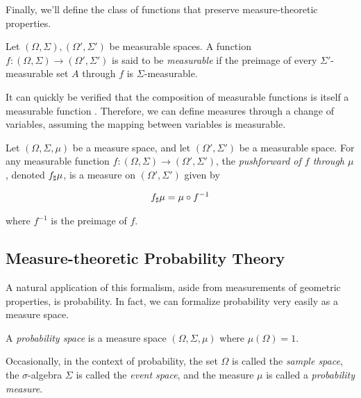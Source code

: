 Finally, we'll define the class of functions that preserve
measure-theoretic properties.

\begin{definition}[Measurability]
  Let $(\Omega, \Sigma), (\Omega', \Sigma')$ be measurable spaces. A
  function $f:(\Omega, \Sigma)\to(\Omega', \Sigma')$ is said to be
  \emph{measurable} if the preimage of every $\Sigma'$-measurable set
  $A$ through $f$ is $\Sigma$-measurable.
\end{definition}

It can quickly be verified that the composition of measurable
functions is itself a measurable function
\citep{cohn2013measure}. Therefore, we can define measures through a
change of variables, assuming the mapping between variables is
measurable.

\begin{definition}
  Let $(\Omega, \Sigma, \mu)$ be a measure space, and let $(\Omega',
  \Sigma')$ be a measurable space. For any measurable function
  $f:(\Omega, \Sigma)\to(\Omega',\Sigma')$, the \emph{pushforward of $f$
    through $\mu$}, denoted ${f}_\sharp \mu$, is a measure on
  $(\Omega', \Sigma')$ given by

  \begin{align*}
    {f}_\sharp \mu = \mu\circ f^{-1}
  \end{align*}

  where $f^{-1}$ is the preimage of $f$.
\end{definition}

\subsection{Measure-theoretic Probability Theory}\label{s:app:measure:probability}
A natural application of this formalism, aside from measurements of
geometric properties, is probability. In fact, we can formalize
probability very easily as a measure space.

\begin{definition}\label{def:probability}
  A \emph{probability space} is a measure space $(\Omega, \Sigma,
  \mu)$ where $\mu(\Omega) = 1$.
\end{definition}

Occasionally, in the context of probability, the set $\Omega$ is
called the \emph{sample space}, the $\sigma$-algebra $\Sigma$ is
called the \emph{event space}, and the measure $\mu$ is called a
\emph{probability measure}.

